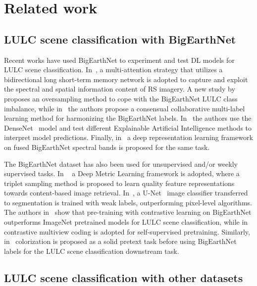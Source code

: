 \documentclass[journal]{IEEEtran}
\begin{document}
\section{Related work}
\subsection{LULC  scene classification with BigEarthNet}
\label{sec:LULCmethods}
Recent works have used BigEarthNet to experiment and test DL models for LULC scene classification. In~\cite{9096309}, a multi-attention strategy that utilizes a bidirectional long short-term memory network is adopted to capture and exploit the spectral and spatial information content of RS imagery. A new study by~\cite{9412588} proposes an oversampling method to cope with the BigEarthNet LULC class imbalance, while in~\cite{DBLP:journals/corr/abs-2105-05496} the authors propose a consensual collaborative multi-label learning method for harmonizing the BigEarthNet labels. In~\cite{kakogeorgiou2021evaluating} the authors use the DenseNet~\citep{Huang_2017_CVPR} model and test different Explainable Artificial Intelligence methods to interpret model predictions. Finally, in~\cite{9537619} a deep representation learning framework on fused BigEarthNet spectral bands is proposed for the same task. 

The BigEarthNet dataset has also been used for unsupervised and/or weekly supervised tasks. In ~\cite{sumbulinformative} a Deep Metric Learning framework is adopted, where a triplet sampling method is proposed to learn quality feature representations towards content-based image retrieval. In~\cite{rs12020207}, a U-Net~\citep{10.1007/978-3-319-24574-4_28} image classifier transferred to segmentation is trained with weak labels, outperforming pixel-level algorithms. The authors in~\cite{manas2021seasonal} show that pre-training with contrastive learning on BigEarthNet outperforms ImageNet pretrained models for LULC scene classification, while in~\cite{stojnic2021self} contrastive multiview coding is adopted for self-supervised pretraining. Similarly, in~\cite{9413112} colorization is proposed as a solid pretext task before using BigEarthNet labels for the LULC scene classification downstream task. 



\subsection{LULC scene classification with other datasets}
\label{sec:otherdata}
\end{document}
